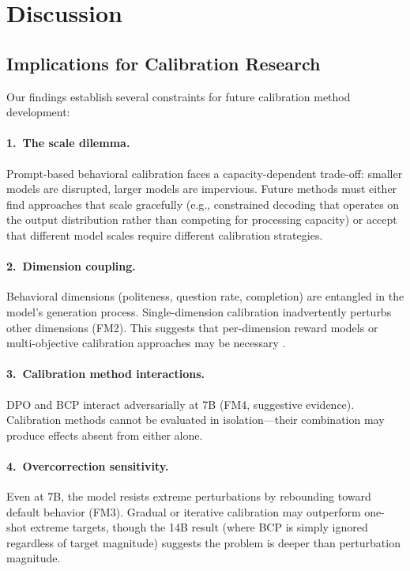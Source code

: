 \documentclass[11pt,a4paper]{article}
\begin{document}
\section{Discussion}

\subsection{Implications for Calibration Research}

Our findings establish several constraints for future calibration method development:

\paragraph{1.\ The scale dilemma.} Prompt-based behavioral calibration faces a capacity-dependent trade-off: smaller models are disrupted, larger models are impervious. Future methods must either find approaches that scale gracefully (e.g., constrained decoding that operates on the output distribution rather than competing for processing capacity) or accept that different model scales require different calibration strategies.

\paragraph{2.\ Dimension coupling.} Behavioral dimensions (politeness, question rate, completion) are entangled in the model's generation process. Single-dimension calibration inadvertently perturbs other dimensions (FM2). This suggests that per-dimension reward models or multi-objective calibration approaches may be necessary \citep[cf.][]{khan2026decoding}.

\paragraph{3.\ Calibration method interactions.} DPO and BCP interact adversarially at 7B (FM4, suggestive evidence). Calibration methods cannot be evaluated in isolation---their combination may produce effects absent from either alone.

\paragraph{4.\ Overcorrection sensitivity.} Even at 7B, the model resists extreme perturbations by rebounding toward default behavior (FM3). Gradual or iterative calibration may outperform one-shot extreme targets, though the 14B result (where BCP is simply ignored regardless of target magnitude) suggests the problem is deeper than perturbation magnitude.
\end{document}
